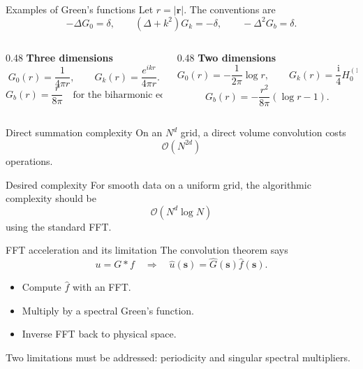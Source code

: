 \documentclass[aspectratio=169,11pt]{beamer}
\newcommand{\cO}{\mathcal{O}}
\newcommand{\ii}{\mathrm i}
\newcommand{\s}{\bm{s}}
\newcommand{\rvec}{\bm{r}}
\begin{document}
\begin{frame}{Examples of Green's functions}
\small
Let $r=|\rvec|$. The conventions are
\[
  -\Delta G_0=\delta,\qquad
  (\Delta+k^2)G_k=-\delta,\qquad
  -\Delta^2G_b=\delta.
\]
\begin{columns}[T,totalwidth=\textwidth]
\begin{column}{0.48\textwidth}
\textbf{Three dimensions}
\[
  G_0(r)=\frac{1}{4\pi r},
  \qquad
  G_k(r)=\frac{e^{ikr}}{4\pi r}.
\]
\[
  G_b(r)=\frac{r}{8\pi}
  \quad\text{for the biharmonic equation.}
\]
\end{column}
\begin{column}{0.48\textwidth}
\textbf{Two dimensions}
\[
  G_0(r)=-\frac{1}{2\pi}\log r,
  \qquad
  G_k(r)=\frac{\ii}{4}H_0^{(1)}(kr).
\]
\[
  G_b(r)=-\frac{r^2}{8\pi}(\log r-1).
\]
\end{column}
\end{columns}
\end{frame}

\begin{frame}{Direct summation complexity}
\small
On an $N^d$ grid, a direct volume convolution costs
\[
  \cO(N^{2d})
\]
operations.

\vspace{2mm}
\begin{block}{Desired complexity}
For smooth data on a uniform grid, the algorithmic complexity should be
\[
  \cO(N^d\log N)
\]
using the standard FFT.
\end{block}
\end{frame}

\begin{frame}{FFT acceleration and its limitation}
\small
The convolution theorem says
\[
  u=G*f
  \quad\Longrightarrow\quad
  \widehat{u}(\s)=\widehat{G}(\s)\widehat{f}(\s).
\]

\begin{itemize}
  \item Compute $\widehat{f}$ with an FFT.
  \item Multiply by a spectral Green's function.
  \item Inverse FFT back to physical space.
\end{itemize}

\vspace{2mm}
Two limitations must be addressed: periodicity and singular spectral
multipliers.
\end{frame}
\end{document}
